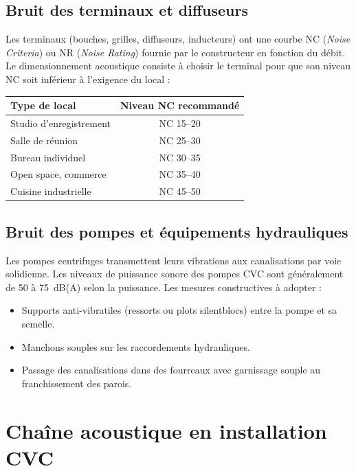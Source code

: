 \subsection{Bruit des terminaux et diffuseurs}

Les terminaux (bouches, grilles, diffuseurs, inducteurs) ont une courbe NC (\textit{Noise Criteria}) ou NR (\textit{Noise Rating}) fournie par le constructeur en fonction du débit. Le dimensionnement acoustique consiste à choisir le terminal pour que son niveau NC soit inférieur à l'exigence du local :

\begin{center}
\begin{tabular}{lc}
\toprule
Type de local & Niveau NC recommandé \\
\midrule
Studio d'enregistrement & NC 15--20 \\
Salle de réunion & NC 25--30 \\
Bureau individuel & NC 30--35 \\
Open space, commerce & NC 35--40 \\
Cuisine industrielle & NC 45--50 \\
\bottomrule
\end{tabular}
\end{center}

\subsection{Bruit des pompes et équipements hydrauliques}

Les pompes centrifuges transmettent leurs vibrations aux canalisations par voie solidienne. Les niveaux de puissance sonore des pompes CVC sont généralement de 50 à 75~dB(A) selon la puissance. Les mesures constructives à adopter :

\begin{itemize}
  \item Supports anti-vibratiles (ressorts ou plots silentblocs) entre la pompe et sa semelle.
  \item Manchons souples sur les raccordements hydrauliques.
  \item Passage des canalisations dans des fourreaux avec garnissage souple au franchissement des parois.
\end{itemize}

\section{Chaîne acoustique en installation CVC}

